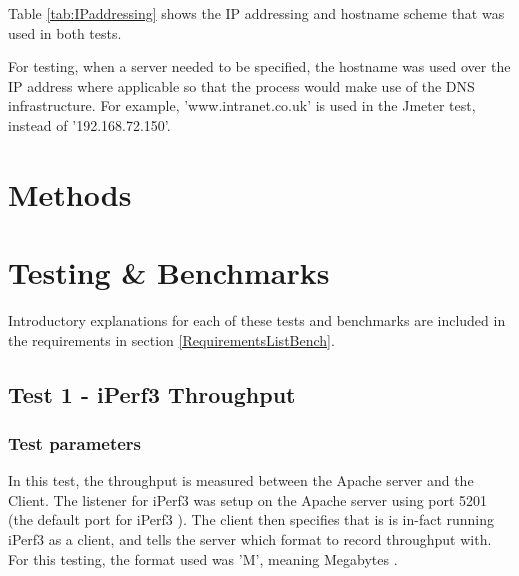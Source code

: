 Table \ref{tab:IPaddressing} shows the IP addressing and hostname scheme that was used in both tests.

\begin{table}[H]
\caption{}
\label{tab:IPaddressing}
\centering
{}
\end{table}

For testing, when a server needed to be specified, the hostname was used over the IP address where applicable so that the process would make use of the DNS infrastructure. For example, 'www.intranet.co.uk' is used in the Jmeter test, instead of '192.168.72.150'.



\chapter{Methods}



\chapter{Testing \& Benchmarks}
Introductory explanations for each of these tests and benchmarks are included in the requirements in section \ref{RequirementsListBench}.

\section{Test 1 - iPerf3 Throughput}
\subsection{Test parameters}
In this test, the throughput is measured between the Apache server and the Client. The listener for iPerf3 was setup on the Apache server using port 5201 (the default port for iPerf3 \citep{iPerf3Documentation}). The client then specifies that is is in-fact running iPerf3 as a client, and tells the server which format to record throughput with. For this testing, the format used was 'M', meaning Megabytes \citep{iPerf3Documentation}.

